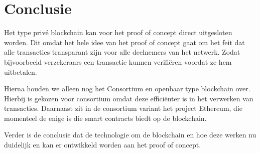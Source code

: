 \chapter{Conclusie}\label{chap:conclusion}
Het type privé blockchain kan voor het proof of concept direct uitgesloten worden. Dit omdat het hele idee van het proof of concept gaat om het feit dat alle transacties transparant zijn voor alle deelnemers van het netwerk. Zodat bijvoorbeeld verzekeraars een transactie kunnen verifiëren voordat ze hem uitbetalen.\par

Hierna houden we alleen nog het Consortium en openbaar type blockchain over. Hierbij is gekozen voor consortium omdat deze efficiënter is in het verwerken van transacties. Daarnaast zit in de consortium variant het project Ethereum, die momenteel de enige is die smart contracts biedt op de blockchain.\par

Verder is de conclusie dat de technologie om de blockchain en hoe deze werken nu duidelijk en kan er ontwikkeld worden aan het proof of concept.